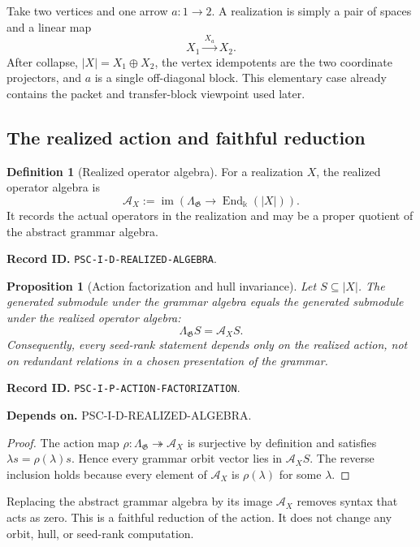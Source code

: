 \documentclass[11pt]{article}
\newtheorem{proposition}[proposition]{Proposition}
\theoremstyle{definition}
\newtheorem{definition}[definition]{Definition}
\theoremstyle{remark}
\newcommand{\bbk}{\Bbbk}
\newcommand{\A}{\mathcal A}
\newcommand{\End}{\operatorname{End}}
\newcommand{\im}{\operatorname{im}}
\newcommand{\RecordID}[1]{\par\smallskip\noindent\begingroup\footnotesize\color{PSCGray}\raggedright\textbf{Record ID.} \nolinkurl{#1}.\par\endgroup}
\newcommand{\Depends}[1]{\par\noindent\begingroup\footnotesize\color{PSCGray}\raggedright\textbf{Depends on.} #1\par\endgroup}
\begin{document}
\begin{microexample}[title={A two-vertex grammar}]
Take two vertices and one arrow \(a:1\to2\).  A realization is simply a pair of spaces and a linear map
\[
X_1\xrightarrow{\,X_a\,}X_2.
\]
After collapse, \(|X|=X_1\oplus X_2\), the vertex idempotents are the two coordinate projectors, and \(a\) is a single off-diagonal block.  This elementary case already contains the packet and transfer-block viewpoint used later.
\end{microexample}


\subsection{The realized action and faithful reduction}
\begin{definition}[Realized operator algebra]
\label{def:realized-algebra}
For a realization $X$, the realized operator algebra is
\[
\A_X:=\im\!\left(\Lambda_{\mathfrak G}\longrightarrow\End_{\bbk}(|X|)\right).
\]
It records the actual operators in the realization and may be a proper quotient of the abstract grammar algebra.
\end{definition}
\RecordID{PSC-I-D-REALIZED-ALGEBRA}

\begin{proposition}[Action factorization and hull invariance]
\label{prop:action-factorization}
Let $S\subseteq |X|$.  The generated submodule under the grammar algebra equals the generated submodule under the realized operator algebra:
\[
\Lambda_{\mathfrak G}S=\A_XS.
\]
Consequently, every seed-rank statement depends only on the realized action, not on redundant relations in a chosen presentation of the grammar.
\end{proposition}
\RecordID{PSC-I-P-ACTION-FACTORIZATION}
\Depends{PSC-I-D-REALIZED-ALGEBRA.}

\begin{proof}
The action map $\rho:\Lambda_{\mathfrak G}\twoheadrightarrow\A_X$ is surjective by definition and satisfies $\lambda s=\rho(\lambda)s$.  Hence every grammar orbit vector lies in $\A_XS$.  The reverse inclusion holds because every element of $\A_X$ is $\rho(\lambda)$ for some $\lambda$.
\end{proof}

\begin{keyidea}
Replacing the abstract grammar algebra by its image \(\A_X\) removes syntax that acts as zero.  This is a faithful reduction of the action.  It does not change any orbit, hull, or seed-rank computation.
\end{keyidea}
\end{document}
